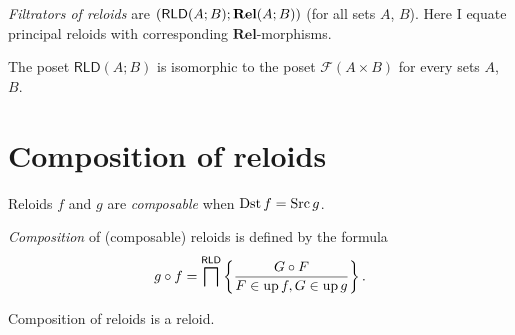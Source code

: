 \emph{Filtrators of reloids} are $(\mathsf{RLD}(A;B);\mbox{\ensuremath{\mathbf{Rel}}}(A;B))$
(for all sets $A$, $B$). Here I equate principal reloids with corresponding $\mathbf{Rel}$-morphisms.

\begin{obvious}
The poset $\mathsf{RLD}(A;B)$ is isomorphic to the poset $\mathscr{F}(A\times B)$
for every sets $A$, $B$.
\end{obvious}

\section{Composition of reloids}
\begin{defn}
Reloids $f$ and $g$ are \emph{composable}
when $\operatorname{Dst} f=\operatorname{Src} g$.
\end{defn}

\begin{defn}
\emph{Composition} of (composable)
reloids is defined by the formula
\[
g\circ f=\bigsqcap^{\mathsf{RLD}}\left\{ \frac{G\circ F}{F\in\operatorname{up} f,G\in\operatorname{up} g}\right\}.
\]
\end{defn}
\begin{obvious}
Composition of reloids is a reloid.
\end{obvious}

